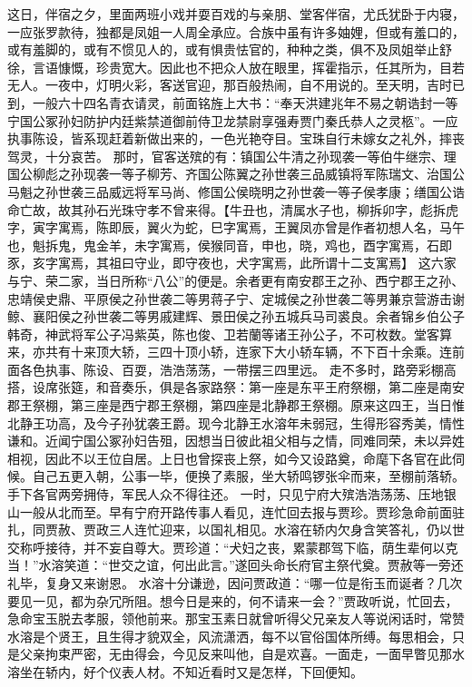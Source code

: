 \documentclass[12pt,oneside]{book}
\begin{document}
这日，伴宿之夕，里面两班小戏并耍百戏的与亲朋、堂客伴宿，尤氏犹卧于内寝，一应张罗款待，独都是凤姐一人周全承应。合族中虽有许多妯娌，但或有羞口的，或有羞脚的，或有不惯见人的，或有惧贵怯官的，种种之类，俱不及凤姐举止舒徐，言语慷慨，珍贵宽大。因此也不把众人放在眼里，挥霍指示，任其所为，目若无人。一夜中，灯明火彩，客送官迎，那百般热闹，自不用说的。至天明，吉时已到，一般六十四名青衣请灵，前面铭旌上大书：“奉天洪建兆年不易之朝诰封一等宁国公冢孙妇防护内廷紫禁道御前侍卫龙禁尉享强寿贾门秦氏恭人之灵柩”。一应执事陈设，皆系现赶着新做出来的，一色光艳夺目。宝珠自行未嫁女之礼外，摔丧驾灵，十分哀苦。
那时，官客送殡的有：镇国公牛清之孙现袭一等伯牛继宗、理国公柳彪之孙现袭一等子柳芳、齐国公陈翼之孙世袭三品威镇将军陈瑞文、治国公马魁之孙世袭三品威远将军马尚、修国公侯晓明之孙世袭一等子侯孝康；缮国公诰命亡故，故其孙石光珠守孝不曾来得。【牛丑也，清属水子也，柳拆卯字，彪拆虎字，寅字寓焉，陈即辰，翼火为蛇，巳字寓焉，王翼凤亦曾是作者初想人名，马午也，魁拆鬼，鬼金羊，未字寓焉，侯猴同音，申也，晓，鸡也，酉字寓焉，石即豕，亥字寓焉，其祖曰守业，即守夜也，犬字寓焉，此所谓十二支寓焉】
这六家与宁、荣二家，当日所称“八公”的便是。余者更有南安郡王之孙、西宁郡王之孙、忠靖侯史鼎、平原侯之孙世袭二等男蒋子宁、定城侯之孙世袭二等男兼京营游击谢鲸、襄阳侯之孙世袭二等男戚建辉、景田侯之孙五城兵马司裘良。余者锦乡伯公子韩奇，神武将军公子冯紫英，陈也俊、卫若蘭等诸王孙公子，不可枚数。堂客算来，亦共有十来顶大轿，三四十顶小轿，连家下大小轿车辆，不下百十余乘。连前面各色执事、陈设、百耍，浩浩荡荡，一带摆三四里远。
走不多时，路旁彩棚高搭，设席张筵，和音奏乐，俱是各家路祭：第一座是东平王府祭棚，第二座是南安郡王祭棚，第三座是西宁郡王祭棚，第四座是北静郡王祭棚。原来这四王，当日惟北静王功高，及今子孙犹袭王爵。现今北静王水溶年未弱冠，生得形容秀美，情性谦和。近闻宁国公冢孙妇告殂，因想当日彼此祖父相与之情，同难同荣，未以异姓相视，因此不以王位自居。上日也曾探丧上祭，如今又设路奠，命麾下各官在此伺候。自己五更入朝，公事一毕，便换了素服，坐大轿鸣锣张伞而来，至棚前落轿。手下各官两旁拥侍，军民人众不得往还。
一时，只见宁府大殡浩浩荡荡、压地银山一般从北而至。早有宁府开路传事人看见，连忙回去报与贾珍。贾珍急命前面驻扎，同贾赦、贾政三人连忙迎来，以国礼相见。水溶在轿内欠身含笑答礼，仍以世交称呼接待，并不妄自尊大。贾珍道：“犬妇之丧，累蒙郡驾下临，荫生辈何以克当！”水溶笑道：“世交之谊，何出此言。”遂回头命长府官主祭代奠。贾赦等一旁还礼毕，复身又来谢恩。
水溶十分谦逊，因问贾政道：“哪一位是衔玉而诞者？几次要见一见，都为杂冗所阻。想今日是来的，何不请来一会？”贾政听说，忙回去，急命宝玉脱去孝服，领他前来。那宝玉素日就曾听得父兄亲友人等说闲话时，常赞水溶是个贤王，且生得才貌双全，风流潇洒，每不以官俗国体所缚。每思相会，只是父亲拘束严密，无由得会，今见反来叫他，自是欢喜。一面走，一面早瞥见那水溶坐在轿内，好个仪表人材。不知近看时又是怎样，下回便知。
\end{document}
